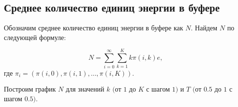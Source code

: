 \documentclass[12pt, a4paper]{article}
\begin{document}
\begin{figure}[h]
\end{figure}

\begin{flushleft}\subsection{Среднее количество единиц энергии в буфере}\end{flushleft}

Обозначим среднее количество единиц энергии в буфере как $N$. Найдем $N$ по следующей формуле:

$$N =\sum\limits_{i = 0}^{\infty} \sum\limits_{k = 1}^{K} k \pi(i, k)e,$$ где $\pi_i = (\pi(i, 0), \pi(i, 1), \ldots, \pi(i, K)).$

Построим график $N$ для значений $k$ $($от $1$ до $K$ с шагом $1)$ и  $T$ $($от $0.5$ до $1$  с шагом $0.5)$.
\end{document}
